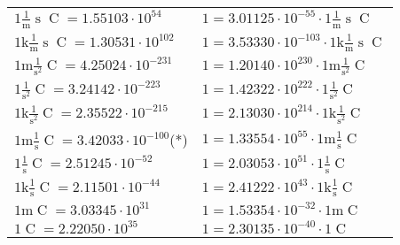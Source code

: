 \begin{center}
\begin{longtable}{l l}
{\color{black}$1 \bm{\mathrm{ }}\frac1{\operatorname{m}}{\operatorname{s}}{\operatorname{C}}{} = 1.55103\cdot10^{54} $}   & {\color{black}$ 1 = 3.01125\cdot10^{-55} \cdot 1 \bm{\mathrm{ }}\frac1{\operatorname{m}}{\operatorname{s}}{\operatorname{C}}{}$}  \\
{\color{gray}$1 \bm{\mathrm{ k}}\frac1{\operatorname{m}}{\operatorname{s}}{\operatorname{C}}{} = 1.30531\cdot10^{102} $}   & {\color{gray}$ 1 = 3.53330\cdot10^{-103} \cdot 1 \bm{\mathrm{ k}}\frac1{\operatorname{m}}{\operatorname{s}}{\operatorname{C}}{}$}  \\
{\color{gray}$1 \bm{\mathrm{ m}}{}\frac1{\operatorname{s}^2}{\operatorname{C}}{} = 4.25024\cdot10^{-231} $}   & {\color{gray}$ 1 = 1.20140\cdot10^{230} \cdot 1 \bm{\mathrm{ m}}{}\frac1{\operatorname{s}^2}{\operatorname{C}}{}$}  \\
{\color{black}$1 \bm{\mathrm{ }}{}\frac1{\operatorname{s}^2}{\operatorname{C}}{} = 3.24142\cdot10^{-223} $}   & {\color{black}$ 1 = 1.42322\cdot10^{222} \cdot 1 \bm{\mathrm{ }}{}\frac1{\operatorname{s}^2}{\operatorname{C}}{}$}  \\
{\color{gray}$1 \bm{\mathrm{ k}}{}\frac1{\operatorname{s}^2}{\operatorname{C}}{} = 2.35522\cdot10^{-215} $}   & {\color{gray}$ 1 = 2.13030\cdot10^{214} \cdot 1 \bm{\mathrm{ k}}{}\frac1{\operatorname{s}^2}{\operatorname{C}}{}$}  \\
{\color{gray}$1 \bm{\mathrm{ m}}{}\frac1{\operatorname{s}}{\operatorname{C}}{} = 3.42033\cdot10^{-100} $}\quad(*) & {\color{gray}$ 1 = 1.33554\cdot10^{55} \cdot 1 \bm{\mathrm{ m}}{}\frac1{\operatorname{s}}{\operatorname{C}}{}$}  \\
{\color{black}$1 \bm{\mathrm{ }}{}\frac1{\operatorname{s}}{\operatorname{C}}{} = 2.51245\cdot10^{-52} $}   & {\color{black}$ 1 = 2.03053\cdot10^{51} \cdot 1 \bm{\mathrm{ }}{}\frac1{\operatorname{s}}{\operatorname{C}}{}$}  \\
{\color{gray}$1 \bm{\mathrm{ k}}{}\frac1{\operatorname{s}}{\operatorname{C}}{} = 2.11501\cdot10^{-44} $}   & {\color{gray}$ 1 = 2.41222\cdot10^{43} \cdot 1 \bm{\mathrm{ k}}{}\frac1{\operatorname{s}}{\operatorname{C}}{}$}  \\
{\color{gray}$1 \bm{\mathrm{ m}}{}{}{\operatorname{C}}{} = 3.03345\cdot10^{31} $}   & {\color{gray}$ 1 = 1.53354\cdot10^{-32} \cdot 1 \bm{\mathrm{ m}}{}{}{\operatorname{C}}{}$}  \\
{\color{black}$1 \bm{\mathrm{ }}{}{}{\operatorname{C}}{} = 2.22050\cdot10^{35} $}   & {\color{black}$ 1 = 2.30135\cdot10^{-40} \cdot 1 \bm{\mathrm{ }}{}{}{\operatorname{C}}{}$}  \\

\end{longtable}
\end{center}
